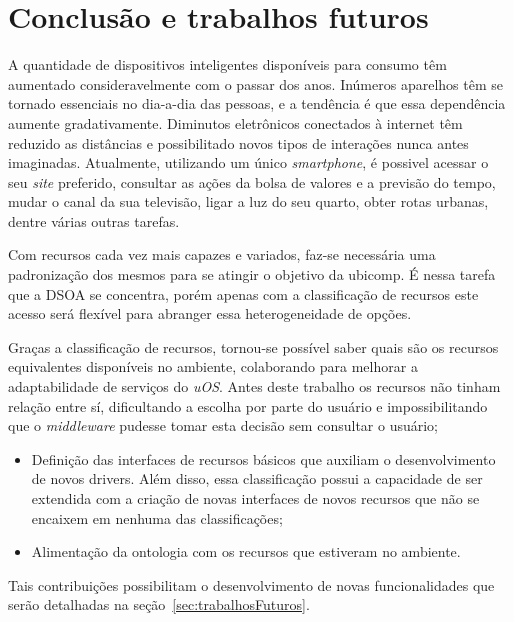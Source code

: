 \chapter{Conclusão e trabalhos futuros}

A quantidade de dispositivos inteligentes disponíveis para consumo têm aumentado consideravelmente com o passar dos anos. Inúmeros aparelhos têm se tornado essenciais no dia-a-dia das pessoas, e a tendência é que essa dependência aumente gradativamente. Diminutos eletrônicos conectados à internet têm reduzido as distâncias e possibilitado novos tipos de interações nunca antes imaginadas. Atualmente, utilizando um único \emph{smartphone}, é possivel acessar o seu \emph{site} preferido, consultar as ações da bolsa de valores e a previsão do tempo, mudar o canal da sua televisão, ligar a luz do seu quarto, obter rotas urbanas, dentre várias outras tarefas.
\begin{comment}
É nesse ambiente cada vez mais ubíquo que a classificação de recursos se insere: ambientes com dispositivos heterogêneos (móveis ou não) interagindo entre si, trocando informações ou utilizando capacidades características de cada aparelho.
\end{comment}

Com recursos cada vez mais capazes e variados, faz-se necessária uma padronização dos mesmos para se atingir o objetivo da ubicomp. É nessa tarefa que a DSOA se concentra, porém apenas com a classificação de recursos este acesso será flexível para abranger essa heterogeneidade de opções.

Graças a classificação de recursos, tornou-se possível saber quais são os recursos equivalentes disponíveis no ambiente, colaborando para melhorar a adaptabilidade de serviços do \emph{uOS}. Antes deste trabalho os recursos não tinham relação entre sí, dificultando a escolha por parte do usuário e impossibilitando que o \emph{middleware} pudesse tomar esta decisão sem consultar o usuário;

\begin{itemize}
	\item Definição das interfaces de recursos básicos que auxiliam o desenvolvimento de novos drivers. Além disso, essa classificação possui a capacidade de ser extendida com a criação de novas interfaces de novos recursos que não se encaixem em nenhuma das classificações;
	\item Alimentação da ontologia com os recursos que estiveram no ambiente.
\end{itemize}

Tais contribuições possibilitam o desenvolvimento de novas funcionalidades que serão detalhadas na seção~\ref{sec:trabalhosFuturos}.

